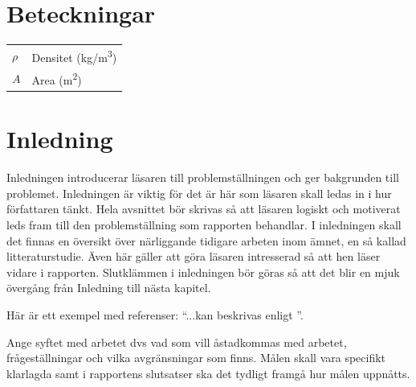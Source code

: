 \documentclass[a4paper]{article}
\begin{document}
\section*{Beteckningar}
\begin{table}[h] 
    \begin{tabular}{l l} %
    $\rho$ & Densitet (\si{kg/m^3}) \\
    $A$ & Area (\si{m^2})
    \end{tabular}
\end{table}

\newpage
{} 
\setcounter{page}{1}
\section{Inledning}
Inledningen introducerar läsaren till problemställningen och ger bakgrunden till problemet. Inledningen är viktig för det är här som läsaren skall ledas in i hur författaren tänkt. Hela avsnittet bör skrivas så att läsaren logiskt och motiverat leds fram till den problemställning som rapporten behandlar. I inledningen skall det finnas en översikt över närliggande tidigare arbeten inom ämnet, en så kallad litteraturstudie. Även här gäller att göra läsaren intresserad så att hen läser vidare i rapporten. Slutklämmen i inledningen bör göras så att det blir en mjuk övergång från Inledning till nästa kapitel.

Här är ett exempel med referenser: ``...kan beskrivas enligt \cite{Sterte2001}''.

Ange syftet med arbetet dvs vad som vill åstadkommas med arbetet, frågeställningar och vilka avgränsningar som finns. Målen skall vara specifikt klarlagda samt i rapportens slutsatser ska det tydligt framgå hur målen uppnåtts.

\end{document}

